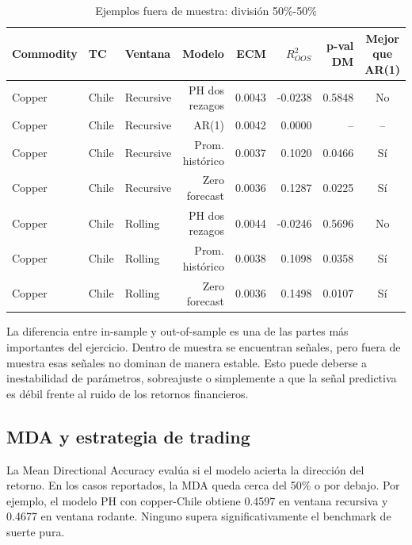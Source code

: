 \documentclass[11pt,a4paper]{article}
\begin{document}
\begin{table}[H]
\centering
\caption{Ejemplos fuera de muestra: división 50\%-50\%}
\scriptsize
\begin{tabular}{lllrrrrc}
\toprule
Commodity & TC & Ventana & Modelo & ECM & $R^2_{OOS}$ & p-val DM & Mejor que AR(1) \\
\midrule
Copper & Chile & Recursive & PH dos rezagos & 0.0043 & -0.0238 & 0.5848 & No \\
Copper & Chile & Recursive & AR(1) & 0.0042 & 0.0000 & -- & -- \\
Copper & Chile & Recursive & Prom. histórico & 0.0037 & 0.1020 & 0.0466 & Sí \\
Copper & Chile & Recursive & Zero forecast & 0.0036 & 0.1287 & 0.0225 & Sí \\
Copper & Chile & Rolling & PH dos rezagos & 0.0044 & -0.0246 & 0.5696 & No \\
Copper & Chile & Rolling & Prom. histórico & 0.0038 & 0.1098 & 0.0358 & Sí \\
Copper & Chile & Rolling & Zero forecast & 0.0036 & 0.1498 & 0.0107 & Sí \\
\bottomrule
\end{tabular}
\end{table}

La diferencia entre in-sample y out-of-sample es una de las partes más importantes del ejercicio. Dentro de muestra se encuentran señales, pero fuera de muestra esas señales no dominan de manera estable. Esto puede deberse a inestabilidad de parámetros, sobreajuste o simplemente a que la señal predictiva es débil frente al ruido de los retornos financieros.

\subsection{MDA y estrategia de trading}

La Mean Directional Accuracy evalúa si el modelo acierta la dirección del retorno. En los casos reportados, la MDA queda cerca del 50\% o por debajo. Por ejemplo, el modelo PH con copper-Chile obtiene 0.4597 en ventana recursiva y 0.4677 en ventana rodante. Ninguno supera significativamente el benchmark de suerte pura.
\end{document}
